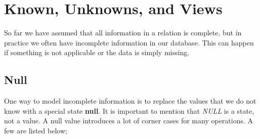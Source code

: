 \section{Known, Unknowns, and Views}
So far we have assumed that all information in a relation is complete, but in practice we often have incomplete information in our database. This can happen if something is not applicable or the data is simply missing.

\subsection{Null}
One way to model incomplete information is to replace the values that we do not know with a special state \textbf{null}. It is important to mention that \textit{NULL} is a state, not a value. A null value introduces a lot of corner cases for many operations. A few are listed below;
